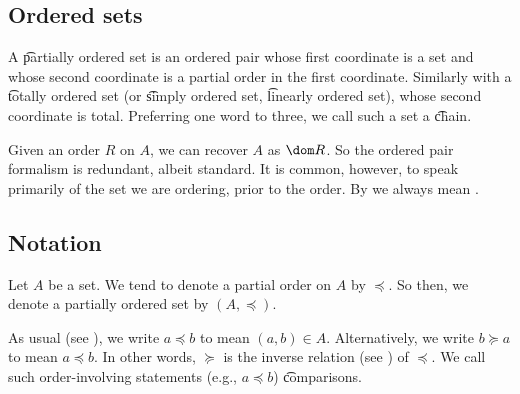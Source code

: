 
\subsection*{Ordered sets}

A \t{partially ordered set} is an ordered pair whose first coordinate is a set and whose second coordinate is a partial order in the first coordinate.
Similarly with a \t{totally ordered set} (or \t{simply ordered set}, \t{linearly ordered set}), whose second coordinate is total.
Preferring one word to three, we call such a set a \t{chain}.

Given an order $R$ on $A$, we can recover $A$ as $\dom R$.
So the ordered pair formalism is redundant, albeit standard.
It is common, however, to speak primarily of the set we are ordering, prior to the order.
By  we always mean .

\subsection*{Notation}

Let $A$ be a set.
We tend to denote a partial order on $A$ by $\preceq$.
So then, we denote a partially ordered set by $(A, \preceq)$.

As usual (see ), we write $a \preceq b$ to mean $(a, b) \in A$.
Alternatively, we write $b \succeq a$ to mean $a \preceq b$.
In other words, $\succeq$ is the inverse relation (see ) of $\preceq$.
We call such order-involving statements (e.g., $a \preceq b$) \t{comparisons}.

